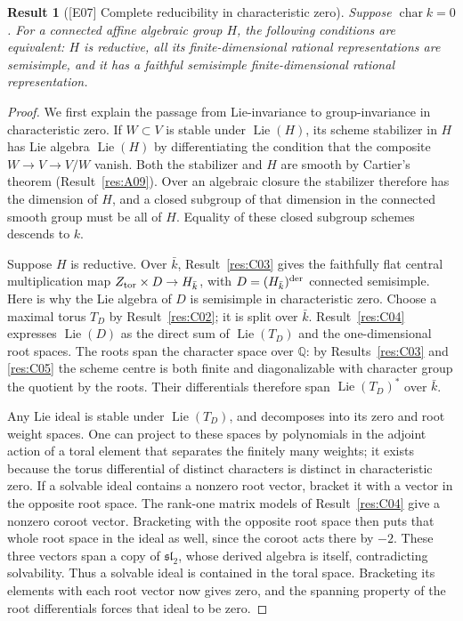 \documentclass[11pt,a4paper,openany,oneside]{book}
\theoremstyle{resultstyle}
\newtheorem{statement}{Result}[chapter]
\newenvironment{result}[2]{\clubpenalty=10000\begin{statement}[\textnormal{[#1]} #2]\leavevmode\label{res:#1}\ignorespaces}{\end{statement}}
\theoremstyle{definition}
\numberwithin{equation}{chapter}
\begin{document}
\begin{result}{E07}{Complete reducibility in characteristic zero}
Suppose \(\operatorname{char} k=0\). For a connected affine algebraic group \(H\), the following conditions are equivalent: \(H\) is reductive, all its finite-dimensional rational representations are semisimple, and it has a faithful semisimple finite-dimensional rational representation.
\end{result}
\begin{proof}
We first explain the passage from Lie-invariance to group-invariance in characteristic zero. If \(W\subset V\) is stable under \(\operatorname{Lie}(H)\), its scheme stabilizer in \(H\) has Lie algebra \(\operatorname{Lie}(H)\) by differentiating the condition that the composite \(W\to V\to V/W\) vanish. Both the stabilizer and \(H\) are smooth by Cartier's theorem (Result~\ref{res:A09}). Over an algebraic closure the stabilizer therefore has the dimension of \(H\), and a closed subgroup of that dimension in the connected smooth group must be all of \(H\). Equality of these closed subgroup schemes descends to \(k\).

Suppose \(H\) is reductive. Over \(\bar k\), Result~\ref{res:C03}
gives the faithfully flat central multiplication map \(Z_{\rm tor}
\times D\to H_{\bar k}\), with \(D=(H_{\bar k})^{\rm der}\)
connected semisimple. Here is why the Lie algebra of \(D\) is
semisimple in characteristic zero. Choose a maximal torus \(T_D\)
by Result~\ref{res:C02}; it is split over \(\bar k\).
Result~\ref{res:C04} expresses \(\operatorname{Lie}(D)\) as the
direct sum of \(\operatorname{Lie}(T_D)\) and the one-dimensional
root spaces. The roots span the character space over \(\mathbb Q\):
by Results~\ref{res:C03} and \ref{res:C05} the scheme centre is
both finite and diagonalizable with character group the quotient
by the roots. Their differentials therefore span
\(\operatorname{Lie}(T_D)^*\) over \(\bar k\).

Any Lie ideal is stable under \(\operatorname{Lie}(T_D)\), and
decomposes into its zero and root weight spaces. One can project
to these spaces by polynomials in the adjoint action of a toral
element that separates the finitely many weights; it exists
because the torus differential of distinct characters is distinct
in characteristic zero. If a solvable ideal contains a nonzero
root vector, bracket it with a vector in the opposite root space.
The rank-one matrix models of Result~\ref{res:C04} give a
nonzero coroot vector. Bracketing with the opposite root space
then puts that whole root space in the ideal as well, since the
coroot acts there by \(-2\). These three vectors span a copy of
\(\mathfrak{sl}_2\), whose derived algebra is itself, contradicting
solvability. Thus a solvable ideal is contained in the toral space.
Bracketing its elements with each root vector now gives zero,
and the spanning property of the root differentials forces that
ideal to be zero.


\end{proof}
\end{document}
